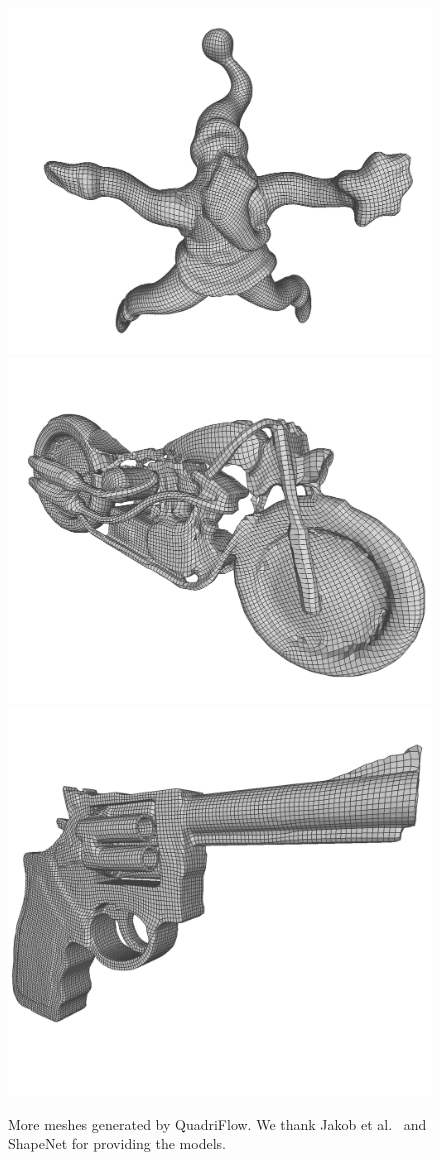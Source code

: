 \begin{figure}
\includegraphics[width=0.32\linewidth]{quadriflow/result/result07.png}
\includegraphics[width=0.32\linewidth]{quadriflow/result/result08.png}
\includegraphics[width=0.32\linewidth]{quadriflow/result/result11.png}
\caption{More meshes generated by QuadriFlow. We thank Jakob et al.~\cite{jakob2015instant} and ShapeNet \cite{chang2015shapenet,huang2018robust} for providing the models.}
\label{fig:quad-challenge}
\end{figure}
